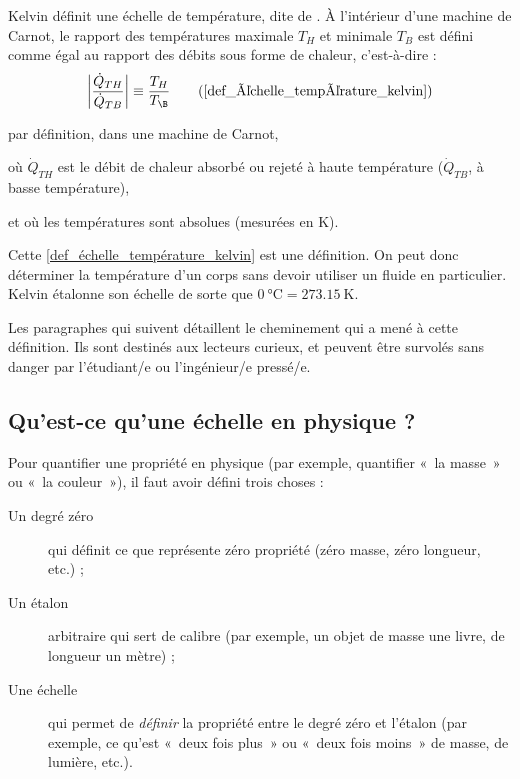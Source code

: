 		Kelvin définit une échelle de température, dite de . À l’intérieur d’une machine de Carnot, le rapport des températures maximale $T_H$ et minimale $T_B$ est défini comme égal au rapport des débits sous forme de chaleur, c’est-à-dire :
		\begin{equation}
			\left| \frac{\dot Q_{TH}}{\dot Q_{TB}} \right| \equiv  \frac{T_H}{T_\B } \tag{\ref{def_échelle_température_kelvin}}
		\end{equation}
		\begin{equationterms}
			\item par définition, dans une machine de Carnot,
			\item où \tab $\dot Q_{TH}$ \tab est le débit de chaleur absorbé ou rejeté à haute température ($\dot Q_{TB}$, à basse température),
			\item et où les températures sont absolues (mesurées en \si{\kelvin}).
		\end{equationterms}

		Cette \cref{def_échelle_température_kelvin} est une définition. On peut donc déterminer la température d’un corps sans devoir utiliser un fluide en particulier. Kelvin étalonne son échelle de sorte que $\SI{0}{\degreeCelsius} = \SI{273,15}{\kelvin}$. 
		
		Les paragraphes qui suivent détaillent le cheminement qui a mené à cette définition. Ils sont destinés aux lecteurs curieux, et peuvent être survolés sans danger par l’étudiant/e ou l’ingénieur/e pressé/e. 


	\subsection{Qu’est-ce qu’une échelle en physique ?}
	
		Pour quantifier une propriété en physique (par exemple, quantifier «~la masse~» ou «~la couleur~»), il faut avoir défini trois choses :
		
		\begin{description}
			\item [Un degré zéro] qui définit ce que représente zéro propriété (zéro masse, zéro longueur, etc.) ;
			\item [Un étalon] arbitraire qui sert de calibre (par exemple, un objet de masse une livre, de longueur un mètre) ;
			\item [Une échelle] qui permet de \emph{définir} la propriété entre le degré zéro et l’étalon (par exemple, ce qu’est «~deux fois plus~» ou «~deux fois moins~» de masse, de lumière, etc.).
		\end{description}


